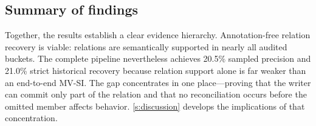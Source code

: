 \subsection{Summary of findings}
\label{s:results-summary}

Together, the results establish a clear evidence hierarchy. Annotation-free relation recovery is viable: relations are semantically supported in nearly all audited buckets. The complete pipeline nevertheless achieves 20.5\% sampled precision and 21.0\% strict historical recovery because relation support alone is far weaker than an end-to-end MV-SI. The gap concentrates in one place---proving that the writer can commit only part of the relation and that no reconciliation occurs before the omitted member affects behavior. \autoref{s:discussion} develops the implications of that concentration.
